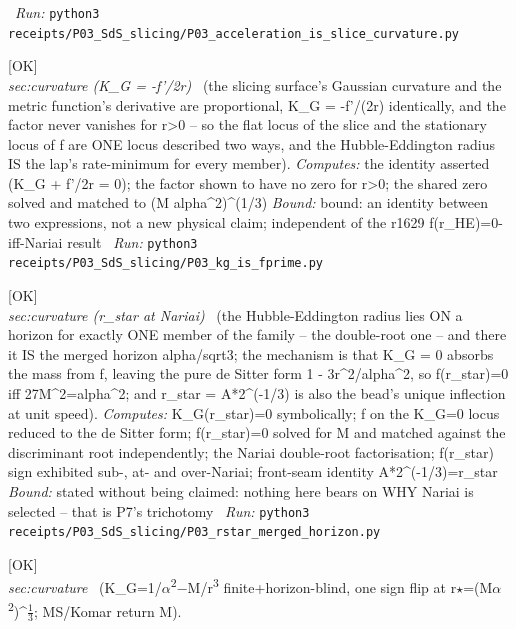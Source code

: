 \begin{description}
\ \emph{Run:} \texttt{python3 receipts/P03\_SdS\_slicing/P03\_acceleration\_is\_slice\_curvature.py}
\item[\label{rcpt:P03_kg_is_fprime}\texttt{P03\_kg\_is\_fprime}]\hfill\textsf{[OK]}\\
\textit{sec:curvature (K\_G = -f'/2r)} \ (the slicing surface's Gaussian curvature and the metric function's derivative are proportional, K\_G = -f'/(2r) identically, and the factor never vanishes for r>0 -- so the flat locus of the slice and the stationary locus of f are ONE locus described two ways, and the Hubble-Eddington radius IS the lap's rate-minimum for every member). 
\emph{Computes:} the identity asserted (K\_G + f'/2r = 0); the factor shown to have no zero for r>0; the shared zero solved and matched to (M alpha\textasciicircum{}2)\textasciicircum{}(1/3)
 \emph{Bound:} bound: an identity between two expressions, not a new physical claim; independent of the r1629 f(r\_HE)=0-iff-Nariai result
\ \emph{Run:} \texttt{python3 receipts/P03\_SdS\_slicing/P03\_kg\_is\_fprime.py}
\item[\label{rcpt:P03_rstar_merged_horizon}\texttt{P03\_rstar\_merged\_horizon}]\hfill\textsf{[OK]}\\
\textit{sec:curvature (r\_star at Nariai)} \ (the Hubble-Eddington radius lies ON a horizon for exactly ONE member of the family -- the double-root one -- and there it IS the merged horizon alpha/sqrt3; the mechanism is that K\_G = 0 absorbs the mass from f, leaving the pure de Sitter form 1 - 3r\textasciicircum{}2/alpha\textasciicircum{}2, so f(r\_star)=0 iff 27M\textasciicircum{}2=alpha\textasciicircum{}2; and r\_star = A*2\textasciicircum{}(-1/3) is also the bead's unique inflection at unit speed). 
\emph{Computes:} K\_G(r\_star)=0 symbolically; f on the K\_G=0 locus reduced to the de Sitter form; f(r\_star)=0 solved for M and matched against the discriminant root independently; the Nariai double-root factorisation; f(r\_star) sign exhibited sub-, at- and over-Nariai; front-seam identity A*2\textasciicircum{}(-1/3)=r\_star
 \emph{Bound:} stated without being claimed: nothing here bears on WHY Nariai is selected -- that is P7's trichotomy
\ \emph{Run:} \texttt{python3 receipts/P03\_SdS\_slicing/P03\_rstar\_merged\_horizon.py}
\item[\label{rcpt:P03_curvature_signflip}\texttt{P03\_curvature\_signflip}]\hfill\textsf{[OK]}\\
\textit{sec:curvature} \ (K\_G=1/\ensuremath{\alpha}\textsuperscript{2}\ensuremath{-}M/r\textsuperscript{3} finite+horizon-blind, one sign flip at r\ensuremath{\star}=(M\ensuremath{\alpha}\textsuperscript{2})\textasciicircum{}\ensuremath{\tfrac13}; MS/Komar return M). 

\end{description}
